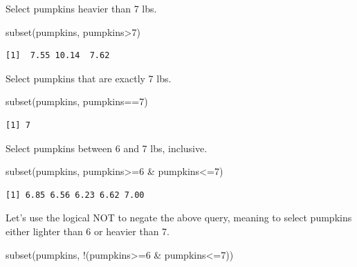 \documentclass[
  letterpaper,
  DIV=11,
  numbers=noendperiod]{scrreprt}
\newenvironment{Shaded}{\begin{snugshade}}{\end{snugshade}}
\newcommand{\DecValTok}[1]{\textcolor[rgb]{0.68,0.00,0.00}{#1}}
\newcommand{\FunctionTok}[1]{\textcolor[rgb]{0.28,0.35,0.67}{#1}}
\newcommand{\NormalTok}[1]{\textcolor[rgb]{0.00,0.23,0.31}{#1}}
\newcommand{\SpecialCharTok}[1]{\textcolor[rgb]{0.37,0.37,0.37}{#1}}
\begin{document}
Select pumpkins heavier than 7 lbs.

\begin{Shaded}
\begin{Highlighting}[]
\FunctionTok{subset}\NormalTok{(pumpkins, pumpkins}\SpecialCharTok{\textgreater{}}\DecValTok{7}\NormalTok{)}
\end{Highlighting}
\end{Shaded}

\begin{verbatim}
[1]  7.55 10.14  7.62
\end{verbatim}

Select pumpkins that are exactly 7 lbs.

\begin{Shaded}
\begin{Highlighting}[]
\FunctionTok{subset}\NormalTok{(pumpkins, pumpkins}\SpecialCharTok{==}\DecValTok{7}\NormalTok{)}
\end{Highlighting}
\end{Shaded}

\begin{verbatim}
[1] 7
\end{verbatim}

Select pumpkins between 6 and 7 lbs, inclusive.

\begin{Shaded}
\begin{Highlighting}[]
\FunctionTok{subset}\NormalTok{(pumpkins, pumpkins}\SpecialCharTok{\textgreater{}=}\DecValTok{6} \SpecialCharTok{\&}\NormalTok{ pumpkins}\SpecialCharTok{\textless{}=}\DecValTok{7}\NormalTok{)}
\end{Highlighting}
\end{Shaded}

\begin{verbatim}
[1] 6.85 6.56 6.23 6.62 7.00
\end{verbatim}

Let's use the logical NOT to negate the above query, meaning to select
pumpkins either lighter than 6 or heavier than 7.

\begin{Shaded}
\begin{Highlighting}[]
\FunctionTok{subset}\NormalTok{(pumpkins, }\SpecialCharTok{!}\NormalTok{(pumpkins}\SpecialCharTok{\textgreater{}=}\DecValTok{6} \SpecialCharTok{\&}\NormalTok{ pumpkins}\SpecialCharTok{\textless{}=}\DecValTok{7}\NormalTok{))}
\end{Highlighting}
\end{Shaded}
\end{document}
